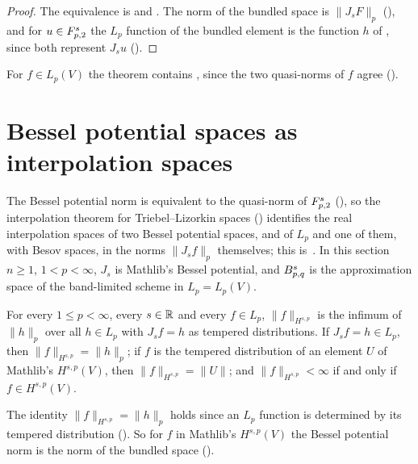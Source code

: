 \begin{proof}
\leanok
The equivalence is  and
. The norm of the bundled space is $\|J_s F\|_p$
(), and for $u \in F^{s}_{p,2}$ the $L_p$ function of the bundled
element is the function $h$ of , since both represent
$J_s u$ ().
\end{proof}

For $f \in L_p(V)$ the theorem contains , since the two
quasi-norms of $f$ agree ().

\section{Bessel potential spaces as interpolation spaces}
\label{sec:bessel-potential-interpolation}

The Bessel potential norm is equivalent to the quasi-norm of $F^{s}_{p,2}$
(), so the interpolation theorem for Triebel--Lizorkin spaces
() identifies the real interpolation spaces of two Bessel potential
spaces, and of $L_p$ and one of them, with Besov spaces, in the norms $\|J_s f\|_p$
themselves; this is~\cite[Theorem~6.4.5(4)]{BerghLofstrom}. In this section $n \geq 1$,
$1 < p < \infty$, $J_s$ is Mathlib's Bessel potential, and $B^{s}_{p,q}$ is the
approximation space of the band-limited scheme in $L_p = L_p(V)$.

\begin{definition}
\label{def:bessel-potential-norm}
\leanok
{}
For every $1 \leq p < \infty$, every $s \in \mathbb{R}$ and every $f \in L_p$, $\|f\|_{H^{s,p}}$ is the
infimum of $\|h\|_p$ over all $h \in L_p$ with $J_s f = h$ as tempered distributions. If
$J_s f = h \in L_p$, then $\|f\|_{H^{s,p}} = \|h\|_p$; if $f$ is the tempered distribution of an
element $U$ of Mathlib's $H^{s,p}(V)$, then $\|f\|_{H^{s,p}} = \|U\|$; and
$\|f\|_{H^{s,p}} < \infty$ if and only if $f \in H^{s,p}(V)$.
\end{definition}

The identity $\|f\|_{H^{s,p}} = \|h\|_p$ holds since an $L_p$ function is determined by its
tempered distribution (). So for $f$ in Mathlib's
$H^{s,p}(V)$ the Bessel potential norm is the norm of the bundled space
().

